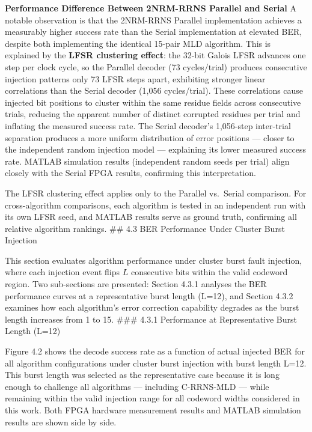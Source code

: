 \documentclass[
  12pt,
  a4paper]{report}
\begin{document}
\textbf{Performance Difference Between 2NRM-RRNS Parallel and Serial} A
notable observation is that the 2NRM-RRNS Parallel implementation
achieves a measurably higher success rate than the Serial implementation
at elevated BER, despite both implementing the identical 15-pair MLD
algorithm. This is explained by the \textbf{LFSR clustering effect}: the
32-bit Galois LFSR advances one step per clock cycle, so the Parallel
decoder (73 cycles/trial) produces consecutive injection patterns only
73 LFSR steps apart, exhibiting stronger linear correlations than the
Serial decoder (1,056 cycles/trial). These correlations cause injected
bit positions to cluster within the same residue fields across
consecutive trials, reducing the apparent number of distinct corrupted
residues per trial and inflating the measured success rate. The Serial
decoder's 1,056-step inter-trial separation produces a more uniform
distribution of error positions --- closer to the independent random
injection model --- explaining its lower measured success rate. MATLAB
simulation results (independent random seeds per trial) align closely
with the Serial FPGA results, confirming this interpretation.

The LFSR clustering effect applies only to the Parallel vs.~Serial
comparison. For cross-algorithm comparisons, each algorithm is tested in
an independent run with its own LFSR seed, and MATLAB results serve as
ground truth, confirming all relative algorithm rankings. \#\# 4.3 BER
Performance Under Cluster Burst Injection

This section evaluates algorithm performance under cluster burst fault
injection, where each injection event flips \(L\) consecutive bits
within the valid codeword region. Two sub-sections are presented:
Section 4.3.1 analyses the BER performance curves at a representative
burst length (L=12), and Section 4.3.2 examines how each algorithm's
error correction capability degrades as the burst length increases from
1 to 15. \#\#\# 4.3.1 Performance at Representative Burst Length (L=12)

Figure 4.2 shows the decode success rate as a function of actual
injected BER for all algorithm configurations under cluster burst
injection with burst length L=12. This burst length was selected as the
representative case because it is long enough to challenge all
algorithms --- including C-RRNS-MLD --- while remaining within the valid
injection range for all codeword widths considered in this work. Both
FPGA hardware measurement results and MATLAB simulation results are
shown side by side.
\end{document}
